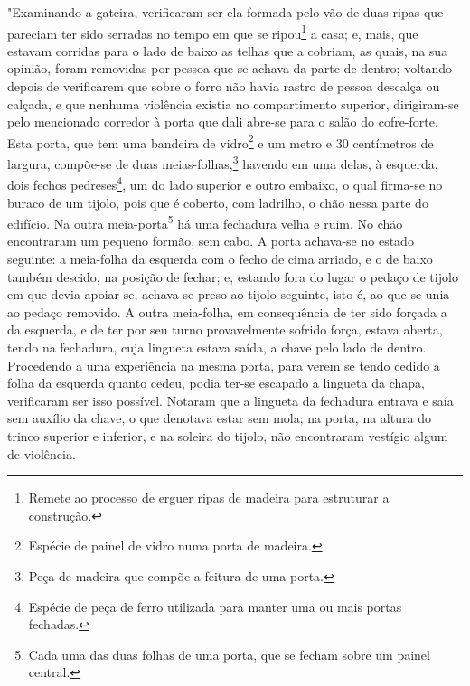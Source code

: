 "Examinando a gateira, verificaram ser ela formada pelo vão de duas
ripas que pareciam ter sido serradas no tempo em que se ripou\footnote{Remete
  ao processo de erguer ripas de madeira para estruturar a construção.}
a casa; e, mais, que estavam corridas para o lado de baixo as telhas que
a cobriam, as quais, na sua opinião, foram removidas por pessoa que se
achava da parte de dentro; voltando depois de verificarem que sobre o
forro não havia rastro de pessoa descalça ou calçada, e que nenhuma
violência existia no compartimento superior, dirigiram-se pelo
mencionado corredor à porta que dali abre-se para o salão do
cofre-forte. Esta porta, que tem uma bandeira de vidro\footnote{Espécie
  de painel de vidro numa porta de madeira.} e um metro e 30 centímetros
de largura, compõe-se de duas meias-folhas,\footnote{Peça de madeira que
  compõe a feitura de uma porta.} havendo em uma delas, à esquerda, dois
fechos pedreses\footnote{Espécie de peça de ferro utilizada para manter
  uma ou mais portas fechadas.}, um do lado superior e outro embaixo, o
qual firma-se no buraco de um tijolo, pois que é coberto, com ladrilho,
o chão nessa parte do edifício. Na outra meia-porta\footnote{Cada uma
  das duas folhas de uma porta, que se fecham sobre um painel central.}
há uma fechadura velha e ruim. No chão encontraram um pequeno formão,
sem cabo. A porta achava-se no estado seguinte: a meia-folha da esquerda
com o fecho de cima arriado, e o de baixo também descido, na posição de
fechar; e, estando fora do lugar o pedaço de tijolo em que devia
apoiar-se, achava-se preso ao tijolo seguinte, isto é, ao que se unia ao
pedaço removido. A outra meia-folha, em consequência de ter sido forçada
a da esquerda, e de ter por seu turno provavelmente sofrido força,
estava aberta, tendo na fechadura, cuja lingueta estava saída, a chave
pelo lado de dentro. Procedendo a uma experiência na mesma porta, para
verem se tendo cedido a folha da esquerda quanto cedeu, podia ter-se
escapado a lingueta da chapa, verificaram ser isso possível. Notaram que
a lingueta da fechadura entrava e saía sem auxílio da chave, o que
denotava estar sem mola; na porta, na altura do trinco superior e
inferior, e na soleira do tijolo, não encontraram vestígio algum de
violência.

